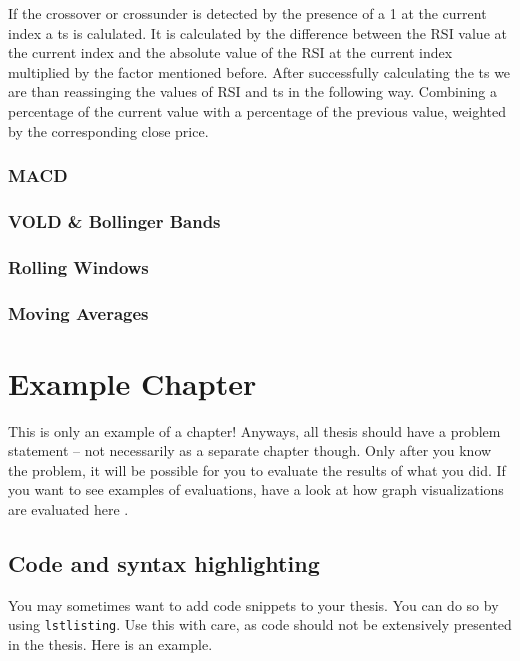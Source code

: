 \documentclass{imc-inf}
\begin{document}
			If the crossover or crossunder is detected by the presence of a 1 at the current index a ts is calulated. It is calculated by
			the difference between the RSI value at the current index and the absolute value of the RSI at the current index multiplied by the factor mentioned before.
			After successfully calculating the ts we are than reassinging the values of RSI and ts in the following way. Combining a 
			percentage of the current value with a percentage of the previous value, weighted by the corresponding close price.
			
			



		\subsection{MACD}
		\subsection{VOLD \& Bollinger Bands}
		\subsection{Rolling Windows}
		\subsection{Moving Averages}
		
	
	


\chapter{Example Chapter}
This is only an example of a chapter! Anyways, all thesis should have a problem statement -- not necessarily as a separate chapter though.
 Only after you know the problem, it will be possible for you to evaluate the results of what you did. If you want to see examples of evaluations,
  have a look at how graph visualizations are evaluated here \cite{DBLP:journals/access/BurchHWPWH21}. 

\section{Code and syntax highlighting}

You may sometimes want to add code snippets to your thesis. You can do so by using \texttt{lstlisting}. Use this with care, as code should not be extensively presented in the thesis. Here is an example. 
\end{document}
